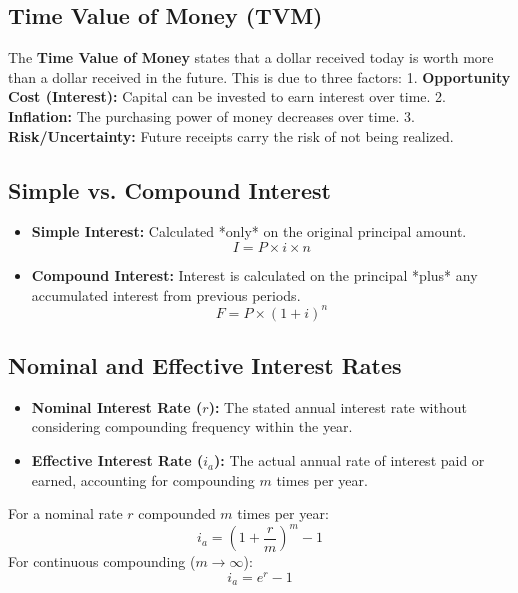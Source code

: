\documentclass[12pt,a4paper]{article}
\begin{document}
\subsection{Time Value of Money (TVM)}
The \textbf{Time Value of Money} states that a dollar received today is worth more than a dollar received in the future. This is due to three factors:
1.  \textbf{Opportunity Cost (Interest):} Capital can be invested to earn interest over time.
2.  \textbf{Inflation:} The purchasing power of money decreases over time.
3.  \textbf{Risk/Uncertainty:} Future receipts carry the risk of not being realized.

\subsection{Simple vs. Compound Interest}
\begin{itemize}[leftmargin=*, itemsep=6pt]
  \item \textbf{Simple Interest:} Calculated *only* on the original principal amount.
    \begin{equation}
      I = P \times i \times n
    \end{equation}
  \item \textbf{Compound Interest:} Interest is calculated on the principal *plus* any accumulated interest from previous periods.
    \begin{equation}
      F = P \times (1 + i)^n
    \end{equation}
\end{itemize}

\subsection{Nominal and Effective Interest Rates}
\begin{itemize}[leftmargin=*, itemsep=4pt]
  \item \textbf{Nominal Interest Rate ($r$):} The stated annual interest rate without considering compounding frequency within the year.
  \item \textbf{Effective Interest Rate ($i_a$):} The actual annual rate of interest paid or earned, accounting for compounding $m$ times per year.
\end{itemize}

\begin{tcolorbox}[formulabox, title={\textbf{Effective Interest Rate Formulas}}]
For a nominal rate $r$ compounded $m$ times per year:
\begin{equation}
  i_a = \left( 1 + \frac{r}{m} \right)^m - 1
\end{equation}
For continuous compounding ($m \to \infty$):
\begin{equation}
  i_a = e^r - 1
\end{equation}
\end{tcolorbox}
\end{document}
